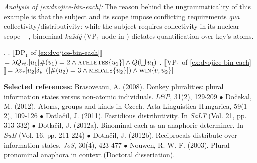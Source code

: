 \documentclass[12pt, a4paper]{scrartcl}
\newcommand{\lb}{\llbracket}
\newcommand{\rb}{\rrbracket}
\newcommand{\sx}[1]{$\lb${#1}$\rb$}
\begin{document}
 
 
 \textit{Analysis of \ref{ex:dvojice-bin-each}:} The reason behind the ungrammaticality of this example is that the subject and its scope impose conflicting requirements \textit{qua} collectivity/distributivity: while the subject requires collectivity in its nuclear scope -- \NNext[a], binominal \textit{každý} (VP$_1$ node in \NNext[b]) dictates quantification over key's atoms.\vspace{-4pt}










\ex. \a. \sx{DP$_1$ of \ref{ex:dvojice-bin-each}}$=\lambda Q_{rt}.[u_1| \#(u_1)=2 \wedge \textsc{athletes}\{u_1\}] \wedge Q(\bigcup u_1)$
\b. \sx{VP$_1$ of \ref{ex:dvojice-bin-each}}$=\lambda v_r[u_2 | \delta_{u_1}([\#(u_2)=3 \wedge \textsc{medals}\{u_2\}]) \wedge \textsc{win}\{v,u_2\}]$






\scriptsize
\noindent\textbf{Selected references:} Brasoveanu, A. (2008). Donkey pluralities: plural information states versus non-atomic individuals. \textit{L\&P}, 31(2), 129-209 $\bullet$ Dočekal, M. (2012). Atoms, groups and kinds in Czech. Acta Linguistica Hungarica, 59(1-2), 109-126 $\bullet$ Dotlačil, J. (2011). Fastidious distributivity. In \textit{SaLT} (Vol. 21, pp. 313-332) $\bullet$ Dotlačil, J. (2012a). Binominal each as an anaphoric determiner. In \textit{SuB} (Vol. 16, pp. 211-224) $\bullet$ Dotlačil, J. (2012b). Reciprocals distribute over information states. \textit{JoS}, 30(4), 423-477 $\bullet$ Nouwen, R. W. F. (2003). Plural pronominal anaphora in context (Doctoral dissertation).


\end{document}
